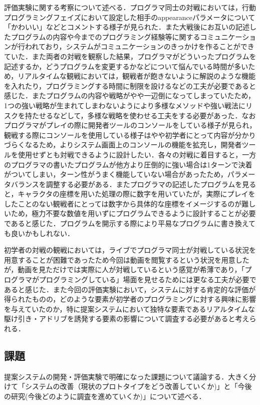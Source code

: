 評価実験に関する考察について述べる．プログラマ同士の対戦においては，行動プログラミングフェイズにおいて設定した相手のappearanceパラメータについて「かわいい」などとコメントする様子が見られた．また大戦後にお互いの記述したプログラムの内容や今までのプログラミング経験等に関するコミュニケーションが行われており，システムがコミュニケーションのきっかけを作ることができていた．また両者の対戦を観察した結果，プログラマがどういったプログラムを記述するか，どうプログラムを変更するかなどについて悩んでいる時間が多いため，リアルタイムな観戦においては，観戦者が飽きないように解説のような機能を入れたり，プログラミングする時間に制限を設けるなどの工夫が必要であると感じた．またプログラムの内容や戦略がやや一辺倒になってしまっていたため，1つの強い戦略が生まれてしまわないようにより多様なメソッドや強い戦法にリスクを持たせるなどして，多様な戦略を使わせる工夫をする必要があった．なおプログラマがプレイの際に開発者ツールのコンソールをしている様子が見られ，観戦する際にコンソールを使用している様子はやや初学者にとって内容が分かりづらくなるため，よりシステム画面上のコンソールの機能を拡充し，開発者ツールを使用せずとも対戦できるように設計したい．各々の対戦に着目すると，一方のプログラマの書いたプログラムが他方より圧倒的に強い場合は1ターンで決着がついてしまい，ターン性がうまく機能していない場合があったため，パラメータバランスを調整する必要がある．またプログラマの記述したプログラムを見ると，キャラクタの座標を用いた処理の際に数字を用いていたが，実際にプレイをしたことのない観戦者にとっては数字から具体的な座標をイメージするのが難しいため，極力不要な数値を用いずにプログラムできるように設計することが必要であると感じた．プログラムを開示する際により平易なプログラムに書き換えても良いかもしれない．

初学者の対戦の観戦においては，ライブでプログラマ同士が対戦している状況を用意することが困難であったため今回は動画を閲覧するという状況を用意したが，動画を見ただけでは実際に人が対戦しているという感覚が希薄であり，「プログラマがプログラミングしている」場面を見せるためには更なる工夫が必要であると感じた．また今回の評価実験において，システムに対する肯定的な評価が得られたものの，どのような要素が初学者のプログラミングに対する興味に影響を与えていたのか，特に提案システムにおいて独特な要素であるリアルタイムな駆け引き・アドリブを誘発する要素の影響について調査する必要があると考えられる．

\subsection{課題}
提案システムの開発・評価実験で明確になった課題について議論する．大きく分けて「システムの改善（現状のプロトタイプをどう改善していくか)」と「今後の研究(今後どのように調査を進めていくか)」について述べる．

